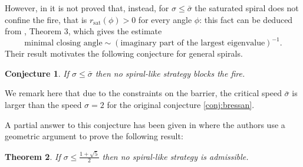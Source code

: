 \documentclass[reqno]{amsart}
\theoremstyle{definition} \newtheorem{definition}{Definition}[section]
\theoremstyle{definition} \newtheorem{remark}[definition]{Remark}
\theoremstyle{plain} \newtheorem{lemma}[definition]{Lemma}
\theoremstyle{plain} \newtheorem{proposition}[definition]{Proposition}
\theoremstyle{plain} \newtheorem{theorem}[definition]{Theorem}
\theoremstyle{plain} \newtheorem{corollary}[definition]{Corollary}
\theoremstyle{definition} \newtheorem{example}[definition]{Example}
\theoremstyle{plain} \newtheorem{claim}[clai]{Claim}
\theoremstyle{definition} \newtheorem{assumption}[definition]{Assumption}
\theoremstyle{definition} \newtheorem{observation}[definition]{Observation}
\newcommand{\1}{\mathbbm 1}
\numberwithin{equation}{section} %
\theoremstyle{plain} \newtheorem*{theorem*}{Theorem}
\theoremstyle{plain} \newtheorem{mthm}[maintheorem]{Main Theorem}
\theoremstyle{plain} \newtheorem*{mthm*}{Main Theorem}
\theoremstyle{plain} \newtheorem*{conjecture*}{Conjecture}
\theoremstyle{plain} \newtheorem{conjecture}[definition]{Conjecture}
\theoremstyle{plain} \newtheorem*{problem*}{Problem}
\begin{document}
However, in \cite{Bressan_friends} it is not proved that, instead, for $\sigma \leq \bar \sigma$ the saturated spiral does not confine the fire, that is $r_{\text{sat}}(\phi) > 0$ for every angle $\phi$: this fact can be deduced from \cite{firefighter}, Theorem $3$, which gives the estimate
\begin{equation*}
\text{minimal closing angle}\sim(\text{imaginary part of the largest eigenvalue})^{-1}.
\end{equation*}
Their result motivates the following conjecture for general spirals.

\begin{conjecture}
\label{conj:spiral}
If $\sigma \leq \bar \sigma$ then no spiral-like strategy blocks the fire.
\end{conjecture}

We remark here that due to the constraints on the barrier, the critical speed $\bar\sigma$ is larger than the speed $\sigma=2$ for the original conjecture \ref{conj:bressan}.

%
%
%
%
%


A partial answer to this conjecture has been given in \cite{firefighter} where the authors use a geometric argument to  prove the following result:

\begin{theorem}
\label{thm:klein}
If $\sigma\leq\frac{1+\sqrt{5}}{2}$ then no spiral-like strategy is admissible. 
\end{theorem}
\end{document}
